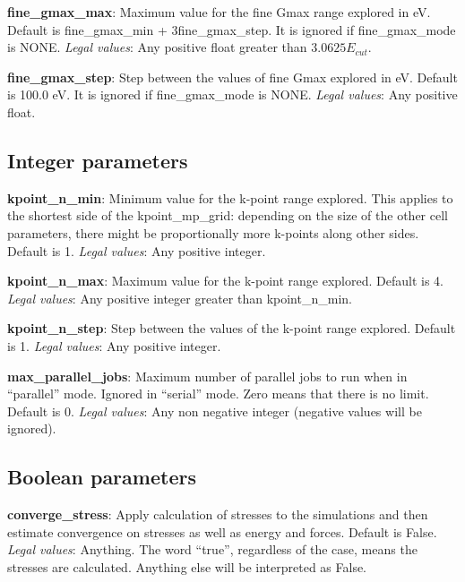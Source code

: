 \documentclass[10pt]{article}
\begin{document}
\textbf{fine\_gmax\_max}: Maximum value for the fine Gmax range explored in eV. Default 
is fine\_gmax\_min + 3fine\_gmax\_step. It is ignored if fine\_gmax\_mode is NONE.\newline
\textit{Legal values}: Any positive float greater than $3.0625E_{cut}$.\newline

\textbf{fine\_gmax\_step}: Step between the values of fine Gmax explored in 
eV. Default is 100.0 eV. It is ignored if fine\_gmax\_mode is NONE.\newline
\textit{Legal values}: Any positive float.\newline

\subsection{Integer parameters}

\textbf{kpoint\_n\_min}: Minimum value for the k-point range explored. This 
applies to the shortest side of the kpoint\_mp\_grid: depending on the size of 
the other cell parameters, there might be proportionally more k-points along 
other sides. Default is 1.\newline
\textit{Legal values}: Any positive integer.\newline

\textbf{kpoint\_n\_max}: Maximum value for the k-point range explored. Default 
is 4.\newline
\textit{Legal values}: Any positive integer greater than kpoint\_n\_min.\newline

\textbf{kpoint\_n\_step}: Step between the values of the k-point range explored. 
Default is 1.\newline
\textit{Legal values}: Any positive integer.\newline

\textbf{max\_parallel\_jobs}: Maximum number of parallel jobs to run when in 
``parallel'' mode. Ignored in ``serial'' mode. Zero means that there is no 
limit. Default is 0.\newline
\textit{Legal values}: Any non negative integer (negative values will be 
ignored).\newline

\subsection{Boolean parameters}

\textbf{converge\_stress}: Apply calculation of stresses to the simulations and 
then estimate convergence on stresses as well as energy and forces. Default is 
False.\newline
\textit{Legal values}: Anything. The word ``true'', regardless of the case, 
means the stresses are calculated. Anything else will be interpreted as 
False.\newline
\end{document}
